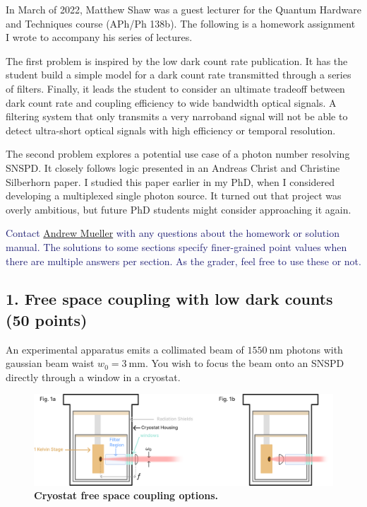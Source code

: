 \documentclass[11pt]{caltech_thesis} %
\begin{document}
\appendix

In March of 2022, Matthew Shaw was a guest lecturer for the Quantum
Hardware and Techniques course (APh/Ph 138b). The following is a
homework assignment I wrote to accompany his series of lectures.

The first problem is inspired by the low dark count rate
publication\autocite{Mueller:21}. It has the student build a simple
model for a dark count rate transmitted through a series of filters.
Finally, it leads the student to consider an ultimate tradeoff between
dark count rate and coupling efficiency to wide bandwidth optical
signals. A filtering system that only transmits a very narroband signal
will not be able to detect ultra-short optical signals with high
efficiency or temporal resolution.

The second problem explores a potential use case of a photon number
resolving SNSPD. It closely follows logic presented in an Andreas Christ
and Christine Silberhorn paper\autocite{Andreas:12}. I studied this
paper earlier in my PhD, when I considered developing a multiplexed
single photon source. It turned out that project was overly ambitious,
but future PhD students might consider approaching it again.

\textcolor{midnightblue}{Contact
\href{mailto:andrewstermueller@gmail.com}{Andrew Mueller} with any
questions about the homework or solution manual. The solutions to some
sections specify finer-grained point values when there are multiple
answers per section. As the grader, feel free to use these or not. }

\hypertarget{free-space-coupling-with-low-dark-counts-50-points}{%
\subsection{1. Free space coupling with low dark counts (50
points)}\label{free-space-coupling-with-low-dark-counts-50-points}}

An experimental apparatus emits a collimated beam of
\(1550~\mathrm{nm}\) photons with gaussian beam waist
\(w_0 = 3~\mathrm{mm}\). You wish to focus the beam onto an SNSPD
directly through a window in a cryostat.

\hypertarget{fig:cryostat_concept}{%
\begin{figure}
\centering
\includegraphics{chapter_05/figs_05/fig1b_light.pdf}
\caption[{Cryostat optical coupling}]{\textbf{Cryostat free space
coupling options.}}
\label{fig:cryostat_concept}
\end{figure}
}
\end{document}
